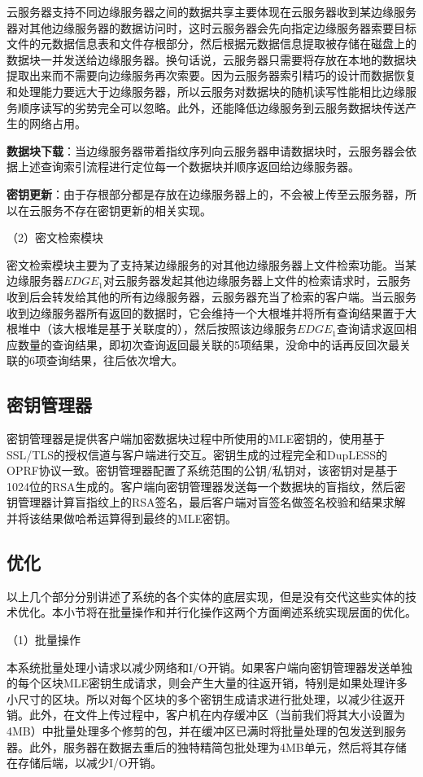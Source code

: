 \documentclass[promaster]{thesis-uestc}
\begin{document}
云服务器支持不同边缘服务器之间的数据共享主要体现在云服务器收到某边缘服务器对其他边缘服务器的数据访问时，这时云服务器会先向指定边缘服务器索要目标文件的元数据信息表和文件存根部分，然后根据元数据信息提取被存储在磁盘上的数据块一并发送给边缘服务器。换句话说，云服务器只需要将存放在本地的数据块提取出来而不需要向边缘服务再次索要。因为云服务器索引精巧的设计而数据恢复和处理能力要远大于边缘服务器，所以云服务对数据块的随机读写性能相比边缘服务顺序读写的劣势完全可以忽略。此外，还能降低边缘服务到云服务数据块传送产生的网络占用。

\textbf{数据块下载}：当边缘服务器带着指纹序列向云服务器申请数据块时，云服务器会依据上述查询索引流程进行定位每一个数据块并顺序返回给边缘服务器。

\textbf{密钥更新}：由于存根部分都是存放在边缘服务器上的，不会被上传至云服务器，所以在云服务不存在密钥更新的相关实现。


（2）密文检索模块

密文检索模块主要为了支持某边缘服务的对其他边缘服务器上文件检索功能。当某边缘服务器$EDGE_1$对云服务器发起其他边缘服务器上文件的检索请求时，云服务收到后会转发给其他的所有边缘服务器，云服务器充当了检索的客户端。当云服务收到边缘服务器所有返回的数据时，它会维持一个大根堆并将所有查询结果置于大根堆中（该大根堆是基于关联度的），然后按照该边缘服务$EDGE_1$查询请求返回相应数量的查询结果，即初次查询返回最关联的5项结果，没命中的话再反回次最关联的6项查询结果，往后依次增大。

\subsection{密钥管理器}
密钥管理器是提供客户端加密数据块过程中所使用的MLE密钥的，使用基于SSL/TLS的授权信道与客户端进行交互。密钥生成的过程完全和DupLESS的OPRF协议一致。密钥管理器配置了系统范围的公钥/私钥对，该密钥对是基于1024位的RSA生成的。客户端向密钥管理器发送每一个数据块的盲指纹，然后密钥管理器计算盲指纹上的RSA签名，最后客户端对盲签名做签名校验和结果求解并将该结果做哈希运算得到最终的MLE密钥。

\subsection{优化}
以上几个部分分别讲述了系统的各个实体的底层实现，但是没有交代这些实体的技术优化。本小节将在批量操作和并行化操作这两个方面阐述系统实现层面的优化。

（1）批量操作

本系统批量处理小请求以减少网络和I/O开销。如果客户端向密钥管理器发送单独的每个区块MLE密钥生成请求，则会产生大量的往返开销，特别是如果处理许多小尺寸的区块。所以对每个区块的多个密钥生成请求进行批处理，以减少往返开销。此外，在文件上传过程中，客户机在内存缓冲区（当前我们将其大小设置为4MB）中批量处理多个修剪的包，并在缓冲区已满时将批量处理的包发送到服务器。此外，服务器在数据去重后的独特精简包批处理为4MB单元，然后将其存储在存储后端，以减少I/O开销。
\end{document}
